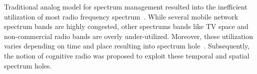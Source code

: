 Traditional analog model for spectrum management resulted into the inefficient utilization of most radio frequency spectrum~\cite{valenta2010survey}. While several mobile network spectrum bands are highly congested, other spectrums bands like TV space and non-commercial radio bands are overly under-utilized. Moreover, these utilization varies depending on time and place resulting into spectrum hole~\cite{tandra2009spectrum}. Subsequently, the notion of cognitive radio was proposed to exploit these temporal and spatial spectrum holes.

